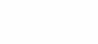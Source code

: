 \newcommand{\cccvname}{Bernd Zuther}
\newcommand{\cccvjobtitle}{Bleeding Edge IT Rockstar}

\NoBgThispage
\AddToShipoutPicture*{\BackgroundPic}
\vspace*{18.5cm}
\noindent
\textcolor{white}{
{\Huge CV\_ \cccvname}\\[8pt]
{\huge (\cccvjobtitle)}\\
\\[8pt]
{\Large codecentric AG | \today}
}
